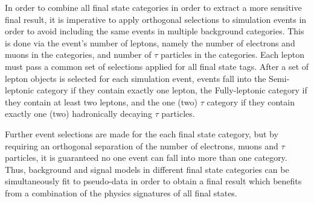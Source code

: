 In order to combine all final state categories in order to extract a more sensitive final result, it is imperative to apply orthogonal selections to simulation events in order to avoid including the same events in multiple background categories. This is done via the event's number of leptons, namely the number of electrons and muons in the \wwgg categories, and number of $\tau$ particles in the \ttgg categories. Each lepton must pass a common set of selections applied for all final state tags. After a set of lepton objects is selected for each simulation event, events fall into the Semi-leptonic \wwgg category if they contain exactly one lepton, the Fully-leptonic \wwgg category if they contain at least two leptons, and the one (two) $\tau$ \ttgg category if they contain exactly one (two) hadronically decaying $\tau$ particles. 

Further event selections are made for the each final state category,
but by requiring an orthogonal separation of the number of electrons, muons and $\tau$ particles, it is guaranteed no one event can fall into more than one category. Thus, background and signal models
in different final state categories can be simultaneously fit to pseudo-data in order to obtain a final result which benefits from a combination of the physics signatures of all final states. 
